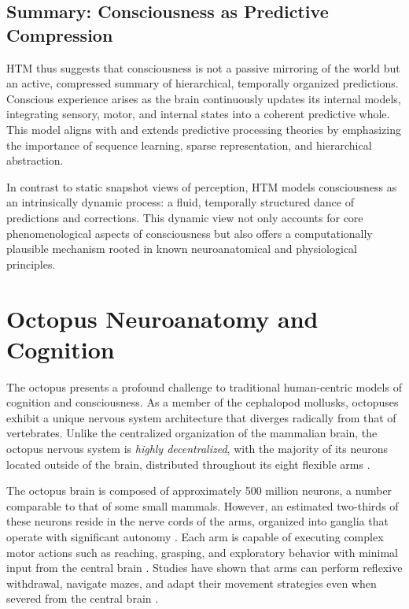 \documentclass[12pt]{article}
\begin{document}
\subsection*{Summary: Consciousness as Predictive Compression}

HTM thus suggests that consciousness is not a passive mirroring of the world but an active, compressed summary of hierarchical, temporally organized predictions. Conscious experience arises as the brain continuously updates its internal models, integrating sensory, motor, and internal states into a coherent predictive whole. This model aligns with and extends predictive processing theories by emphasizing the importance of sequence learning, sparse representation, and hierarchical abstraction.

In contrast to static snapshot views of perception, HTM models consciousness as an intrinsically dynamic process: a fluid, temporally structured dance of predictions and corrections. This dynamic view not only accounts for core phenomenological aspects of consciousness but also offers a computationally plausible mechanism rooted in known neuroanatomical and physiological principles.

\section{Octopus Neuroanatomy and Cognition}

The octopus presents a profound challenge to traditional human-centric models of cognition and consciousness. As a member of the cephalopod mollusks, octopuses exhibit a unique nervous system architecture that diverges radically from that of vertebrates. Unlike the centralized organization of the mammalian brain, the octopus nervous system is \textit{highly decentralized}, with the majority of its neurons located outside of the brain, distributed throughout its eight flexible arms \cite{hochner2012octopus, godfrey-smith2016octopus}.

The octopus brain is composed of approximately 500 million neurons, a number comparable to that of some small mammals. However, an estimated two-thirds of these neurons reside in the nerve cords of the arms, organized into ganglia that operate with significant autonomy \cite{godfrey-smith2016octopus}. Each arm is capable of executing complex motor actions such as reaching, grasping, and exploratory behavior with minimal input from the central brain \cite{zylinski2013arm}. Studies have shown that arms can perform reflexive withdrawal, navigate mazes, and adapt their movement strategies even when severed from the central brain \cite{gutnick2011octopus}.
\end{document}
